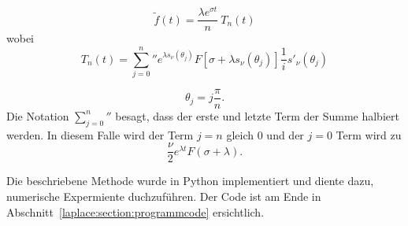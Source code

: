 \begin{equation}
\tilde{f}(t) = \frac{\lambda e^{\sigma t}}{n}~T_{n}(t)
\end{equation}
wobei 
\begin{equation}
T_{n}(t)
=
{\sum_{j=0}^n}'' e^{\lambda s_{\nu}(\theta_{j})}
F[\sigma + \lambda s_{\nu}(\theta_{j})]
\frac{1}{i} s'_{\nu}(\theta_{j})
\end{equation}

\begin{equation}
\theta_{j} = j \frac{\pi}{n}.
\end{equation}
Die Notation ${\sum_{j=0}^n}''$ besagt, dass der erste und letzte
Term der Summe halbiert werden.
In diesem Falle wird der Term $j=n$ gleich 0 und der $j=0$ Term wird zu
\begin{equation}
\frac{\nu}{2}e^{\lambda t}F(\sigma + \lambda).
\end{equation}


Die beschriebene Methode wurde in Python implementiert und diente
dazu, numerische Expermiente duchzuführen.
Der Code ist am Ende in Abschnitt~\ref{laplace:section:programmcode}
ersichtlich.

